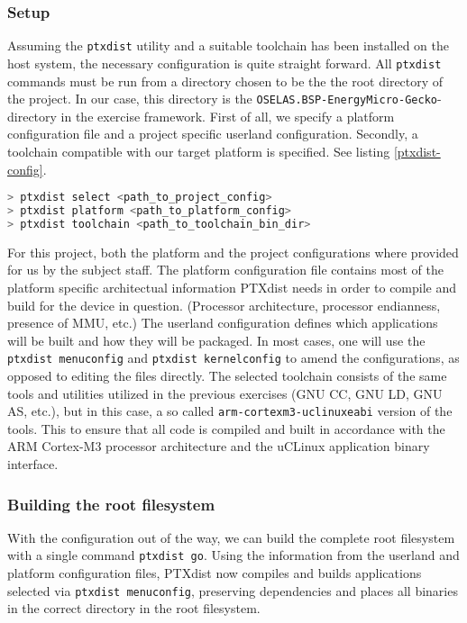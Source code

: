 \subsubsection{Setup}

Assuming the \texttt{ptxdist} utility and a suitable toolchain has been installed on the host system, the necessary configuration is quite straight forward. All \texttt{ptxdist} commands must be run from a directory chosen to be the the root directory of the project. In our case, this directory is the \texttt{OSELAS.BSP-EnergyMicro-Gecko}-directory in the exercise framework. First of all, we specify a platform configuration file and a project specific userland configuration. Secondly, a toolchain compatible with our target platform is specified. See listing \ref{ptxdist-config}.

\begin{lstlisting}[language=C, label=ptxdist-config, caption=Config]
> ptxdist select <path_to_project_config>
> ptxdist platform <path_to_platform_config>
> ptxdist toolchain <path_to_toolchain_bin_dir>
\end{lstlisting}

For this project, both the platform and the project configurations where provided for us by the subject staff. The platform configuration file contains most of the platform specific architectual information PTXdist needs in order to compile and build for the device in question. (Processor architecture, processor endianness, presence of MMU, etc.) The userland configuration defines which applications will be built and how they will be packaged. In most cases, one will use the \texttt{ptxdist menuconfig} and \texttt{ptxdist kernelconfig} to amend the configurations, as opposed to editing the files directly. The selected toolchain consists of the same tools and utilities utilized in the previous exercises (GNU CC, GNU LD, GNU AS, etc.)\cite[p.~4]{exercise2report}, but in this case, a so called \texttt{arm-cortexm3-uclinuxeabi} version of the tools. This to ensure that all code is compiled and built in accordance with the ARM Cortex-M3 processor architecture and the uCLinux application binary interface.

\subsubsection{Building the root filesystem}

With the configuration out of the way, we can build the complete root filesystem with a single command \texttt{ptxdist go}.
Using the information from the userland and platform configuration files, PTXdist now compiles and builds applications selected via \texttt{ptxdist menuconfig}, preserving dependencies and places all binaries in the correct directory in the root filesystem.

